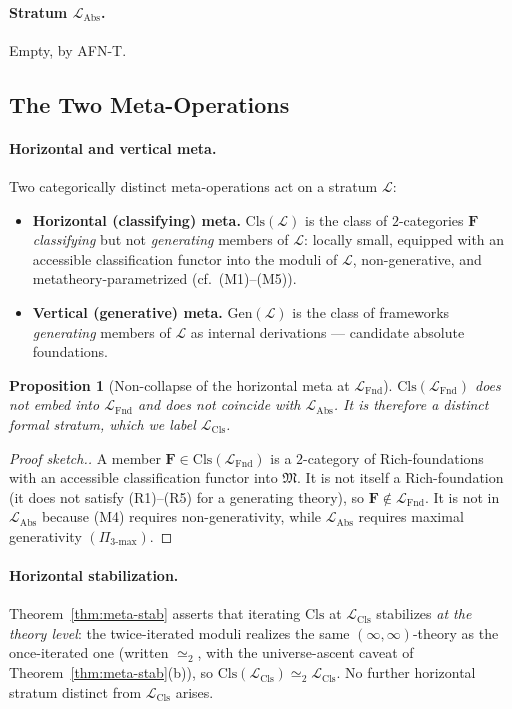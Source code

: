 \documentclass[11pt]{article}
\theoremstyle{plain}
\newtheorem{proposition}[theorem]{Proposition}
\theoremstyle{definition}
\newcommand{\fM}{\mathfrak{M}}
\newcommand{\LFnd}{\mathcal{L}_{\mathrm{Fnd}}}
\newcommand{\LCls}{\mathcal{L}_{\mathrm{Cls}}}
\newcommand{\LAbs}{\mathcal{L}_{\mathrm{Abs}}}
\begin{document}
\paragraph{Stratum $\LAbs$.} Empty, by AFN-T.

\subsection{The Two Meta-Operations}\label{sec:indexing-scheme}

\paragraph{Horizontal and vertical meta.} Two categorically distinct meta-operations act on a stratum $\mathcal{L}$:
\begin{itemize}
\item \textbf{Horizontal (classifying) meta.} $\mathrm{Cls}(\mathcal{L})$ is the class of $2$-categories $\mathbf{F}$ \emph{classifying} but not \emph{generating} members of $\mathcal{L}$: locally small, equipped with an accessible classification functor into the moduli of $\mathcal{L}$, non-generative, and metatheory-parametrized (cf.\ (M1)--(M5)).
\item \textbf{Vertical (generative) meta.} $\mathrm{Gen}(\mathcal{L})$ is the class of frameworks \emph{generating} members of $\mathcal{L}$ as internal derivations --- candidate absolute foundations.
\end{itemize}

\begin{proposition}[Non-collapse of the horizontal meta at $\LFnd$]\label{prop:no-collapse}
$\mathrm{Cls}(\LFnd)$ does \emph{not} embed into $\LFnd$ and does not coincide with $\LAbs$. It is therefore a distinct formal stratum, which we label $\LCls$.
\end{proposition}

\begin{proof}[Proof sketch.]
A member $\mathbf{F} \in \mathrm{Cls}(\LFnd)$ is a $2$-category of Rich-foundations with an accessible classification functor into $\fM$. It is not itself a Rich-foundation (it does not satisfy (R1)--(R5) for a generating theory), so $\mathbf{F} \notin \LFnd$. It is not in $\LAbs$ because (M4) requires non-generativity, while $\LAbs$ requires maximal generativity $(\Pi_{3\text{-max}})$.
\end{proof}

\paragraph{Horizontal stabilization.} Theorem~\ref{thm:meta-stab} asserts that iterating $\mathrm{Cls}$ at $\LCls$ stabilizes \emph{at the theory level}: the twice-iterated moduli realizes the same $(\infty, \infty)$-theory as the once-iterated one (written $\simeq_2$, with the universe-ascent caveat of Theorem~\ref{thm:meta-stab}(b)), so $\mathrm{Cls}(\LCls) \simeq_2 \LCls$. No further horizontal stratum distinct from $\LCls$ arises.
\end{document}
